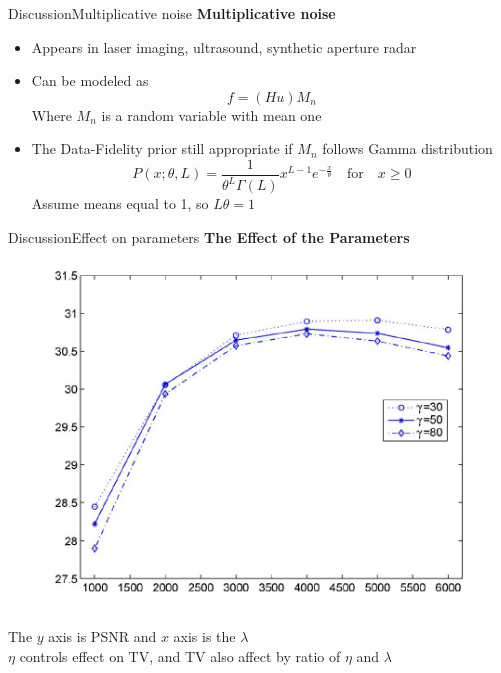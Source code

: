 \documentclass{beamer}
\begin{document}
\begin{frame}[t]{Discussion}{Multiplicative noise}
\textbf{Multiplicative noise}
\begin{itemize}
    \item Appears in laser imaging, ultrasound, synthetic aperture radar
    \item Can be modeled as 
    \[
        f = (Hu)M_n
    \]
    Where $M_n$ is a random variable with mean one
    \item The Data-Fidelity prior still appropriate if $M_n$ follows Gamma distribution
    \[
        P(x;\theta, L) = \frac{1}{\theta^L\Gamma(L)}x^{L-1}e^{-\frac{x}{\theta}} \quad \textrm{for} \quad x \geq 0
    \]
    Assume means equal to 1, so $L\theta=1$
\end{itemize}
\end{frame}

\begin{frame}[t]{Discussion}{Effect on parameters}
    \textbf{The Effect of the Parameters}
    \begin{figure}
        \centering
        \includegraphics[scale=0.33]{psnr_vs_lambda.png}
    \end{figure}
    \footnotesize{
        The $y$ axis is PSNR and $x$ axis is the $\lambda$ \\
        $\eta$ controls effect on TV, and TV also affect by ratio of $\eta$ and $\lambda$
    }
\end{frame}
\end{document}
